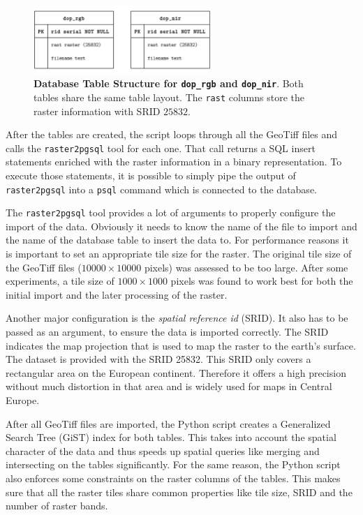 \begin{figure}[h]
    \centering
    \includegraphics[width=0.6\textwidth]{images/dop_entities}
    \caption[Database Table Structure for \texttt{dop\_rgb} and \texttt{dop\_nir}]
    {\textbf{Database Table Structure for \texttt{dop\_rgb} and \texttt{dop\_nir}}. Both tables share the same table layout. The \texttt{rast} columns store the raster information with SRID $25832$.}
    \label{fig:dop_entities}
\end{figure}

After the tables are created, the script loops through all the GeoTiff files and calls the \texttt{raster2pgsql} tool for each one. That call returns a SQL insert statements enriched with the raster information in a binary representation. To execute those statements, it is possible to simply pipe the output of \texttt{raster2pgsql} into a \texttt{psql} command which is connected to the database.

The \texttt{raster2pgsql} tool provides a lot of arguments to properly configure the import of the data. Obviously it needs to know the name of the file to import and the name of the database table to insert the data to. For performance reasons it is important to set an appropriate tile size for the raster. The original tile size of the GeoTiff files ($10000\times 10000$ pixels) was assessed to be too large. After some experiments, a tile size of $1000\times 1000$ pixels was found to work best for both the initial import and the later processing of the raster.

Another major configuration is the \emph{spatial reference id} (SRID). It also has to be passed as an argument, to ensure the data is imported correctly. The SRID indicates the map projection that is used to map the raster to the earth's surface. The dataset is provided with the SRID 25832. This SRID only covers a rectangular area on the European continent. Therefore it offers a high precision without much distortion in that area and is widely used for maps in Central Europe.

After all GeoTiff files are imported, the Python script creates a Generalized Search Tree (GiST) index for both tables. This takes into account the spatial character of the data and thus speeds up spatial queries like merging and intersecting on the tables significantly. For the same reason, the Python script also enforces some constraints on the raster columns of the tables. This makes sure that all the raster tiles share common properties like tile size, SRID and the number of raster bands.

